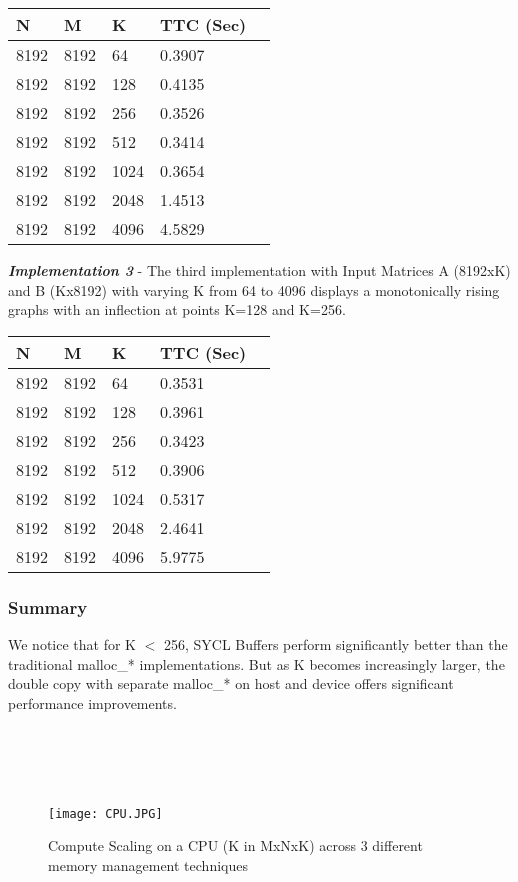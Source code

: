 \documentclass[14pt,fleqn]{article}
\begin{document}
\begin{center}
\begin{tabular}{|l|l|l|l|l|}                                   
    \hline\hline         
    N  & M & K & TTC (Sec) \\
    \hline\hline
    8192 & 8192 & 64 & 0.3907 \\ \hline
    8192 & 8192 & 128 & 0.4135 \\ \hline
    8192 & 8192 & 256 & 0.3526 \\ \hline
    8192 & 8192 & 512 & 0.3414 \\ \hline
    8192 & 8192 & 1024 & 0.3654 \\ \hline
    8192 & 8192 & 2048 & 1.4513 \\ \hline
    8192 & 8192 & 4096 & 4.5829 \\ \hline

\end{tabular}
\end{center}

\textit{\textbf{Implementation 3}} - The third implementation with Input Matrices A (8192xK) and B (Kx8192) with varying K from 64 to 4096 displays a monotonically rising graphs with an inflection at points K=128 and K=256.\\

\begin{center}
\begin{tabular}{|l|l|l|l|l|}                                   
    \hline\hline         
    N  & M & K & TTC (Sec) \\
    \hline\hline
    8192 & 8192 & 64 & 0.3531 \\ \hline
    8192 & 8192 & 128 & 0.3961 \\ \hline
    8192 & 8192 & 256 & 0.3423 \\ \hline
    8192 & 8192 & 512 & 0.3906 \\ \hline
    8192 & 8192 & 1024 & 0.5317 \\ \hline
    8192 & 8192 & 2048 & 2.4641 \\ \hline
    8192 & 8192 & 4096 & 5.9775 \\ \hline

\end{tabular}
\end{center}

\subsubsection{Summary}
We notice that for K $<$ 256, SYCL Buffers perform significantly better than the traditional malloc\_* implementations. But as K becomes increasingly larger, the double copy with separate malloc\_* on host and device offers significant performance improvements.\\
\\\\\\\\
\begin{figure}
\centering
\texttt{[image: CPU.JPG]}
\caption{Compute Scaling on a CPU (K in MxNxK) across 3 different memory management techniques}
\end{figure}
\\\\
\end{document}

